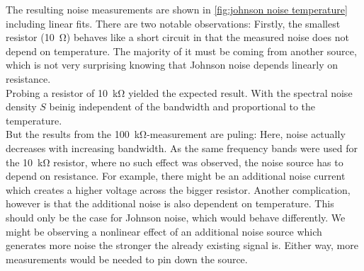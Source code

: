 \documentclass[
    parskip=half, 
    twoside=false,
    twocolumn=true,
    fontsize=11pt,
]{scrarticle}
\begin{document}

The resulting noise measurements are shown in \autoref{fig:johnson noise temperature} including linear fits.
There are two notable observations: 
Firstly, the smallest resistor (\SI{10}{\ohm}) behaves like a short circuit in that the measured noise does not depend on temperature. 
The majority of it must be coming from another source, which is not very surprising knowing that Johnson noise depends linearly on resistance.\\
Probing a resistor of \SI{10}{\kilo\ohm} yielded the expected result. 
With the spectral noise density $S$ beinig independent of the bandwidth and proportional to the temperature.\\
But the results from the \SI{100}{\kilo\ohm}-measurement are puling: Here, noise actually decreases with increasing bandwidth. 
As the same frequency bands were used for the \SI{10}{\kilo\ohm} resistor, where no such effect was observed, the noise source has to depend on resistance. 
For example, there might be an additional noise current which creates a higher voltage across the bigger resistor.
Another complication, however is that the additional noise is also dependent on temperature. 
This should only be the case for Johnson noise, which would behave differently. 
We might be observing a nonlinear effect of an additional noise source which generates more noise the stronger the already existing signal is.
Either way, more measurements would be needed to pin down the source.
\end{document}
